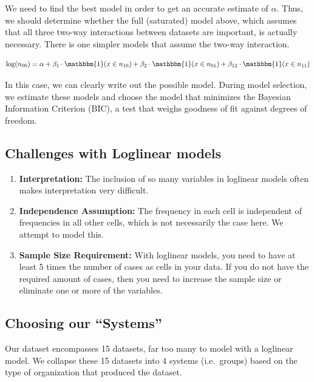 \documentclass[]{article}
\providecommand{\tightlist}{%
  \setlength{\itemsep}{0pt}\setlength{\parskip}{0pt}}
\begin{document}
We need to find the best model in order to get an accurate estimate of
\(\alpha\). Thus, we should determine whether the full (saturated) model
above, which assumes that all three two-way interactions between
datasets are important, is actually necessary. There is one simpler
models that assume the two-way interaction.

\[
\log(n_{00}) = \alpha 
+ \beta_1 \cdot \mathbbm{1}(x\in n_{10}) 
+ \beta_2 \cdot \mathbbm{1}(x\in n_{01}) 
+ \beta_{12} \cdot \mathbbm{1}(x \in n_{11})
\]

In this case, we can clearly write out the possible model. During model
selection, we estimate these models and choose the model that minimizes
the Bayesian Information Criterion (BIC), a test that weighs goodness of
fit against degrees of freedom.

\hypertarget{challenges-with-loglinear-models}{%
\subsection{Challenges with Loglinear
models}\label{challenges-with-loglinear-models}}

\begin{enumerate}
\def\labelenumi{\arabic{enumi}.}
\tightlist
\item
  \textbf{Interpretation:} The inclusion of so many variables in
  loglinear models often makes interpretation very difficult.\\
\item
  \textbf{Independence Assumption:} The frequency in each cell is
  independent of frequencies in all other cells, which is not
  necessarily the case here. We attempt to model this.\\
\item
  \textbf{Sample Size Requirement:} With loglinear models, you need to
  have at least 5 times the number of cases as cells in your data. If
  you do not have the required amount of cases, then you need to
  increase the sample size or eliminate one or more of the variables.
\end{enumerate}

\hypertarget{choosing-our-systems}{%
\subsection{Choosing our ``Systems''}\label{choosing-our-systems}}

Our dataset encompasses 15 datasets, far too many to model with a
loglinear model. We collapse these 15 datasets into 4 systems
(i.e.~groups) based on the type of organization that produced the
dataset.
\end{document}
